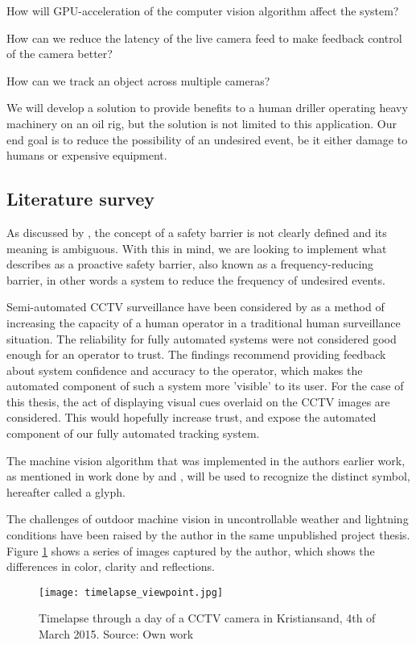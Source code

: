 How will GPU-acceleration of the computer vision algorithm affect the system?

How can we reduce the latency of the live camera feed to make feedback control of the camera better?

How can we track an object across multiple cameras?

We will develop a solution to provide benefits to a human driller operating heavy machinery on an oil rig, but the solution is not limited to this application. Our end goal is to reduce the possibility of an undesired event, be it either damage to humans or expensive equipment.

\subsection{Literature survey}
As discussed by \citet{sklet05}, the concept of a safety barrier is not clearly defined and its meaning is ambiguous. With this in mind, we are looking to implement what \citet{rausand14} describes as a proactive safety barrier, also known as a frequency-reducing barrier, in other words a system to reduce the frequency of undesired events.

Semi-automated CCTV surveillance have been considered by \citet{dadashi12} as a method of increasing the capacity of a human operator in a traditional human surveillance situation. The reliability for fully automated systems were not considered good enough for an operator to trust. The findings recommend providing feedback about system confidence and accuracy to the operator, which makes the automated component of such a system more 'visible' to its user. For the case of this thesis, the act of displaying visual cues overlaid on the CCTV images are considered. This would hopefully increase trust, and expose the automated component of our fully automated tracking system.

The machine vision algorithm that was implemented in the authors earlier work, as mentioned in work done by \citet{boyers13} and \citet{kirillov10}, will be used to recognize the distinct symbol, hereafter called a glyph.

The challenges of outdoor machine vision in uncontrollable weather and lightning conditions have been raised by the author in the same unpublished project thesis. Figure \ref{fig:timelapse_viewpoint} shows a series of images captured by the author, which shows the differences in color, clarity and reflections.

\begin{figure}[ht]
    \centering
    \texttt{[image: timelapse\_viewpoint.jpg]}
    \caption{Timelapse through a day of a CCTV camera in Kristiansand, 4th of March 2015. Source: Own work}
    \label{fig:timelapse_viewpoint}
\end{figure}
\FloatBarrier

